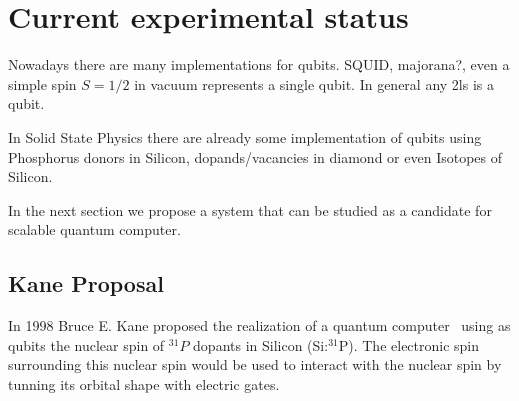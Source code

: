\chapter{Current experimental status}

Nowadays there are many implementations for qubits. SQUID, majorana?, even a simple spin $S=1/2$ in vacuum represents a single qubit. In general any \ac{2ls} is a qubit.

In Solid State Physics there are already some implementation of qubits using Phosphorus donors in Silicon, dopands/vacancies in diamond or even Isotopes of Silicon.

In the next section we propose a system that can be studied as a candidate for scalable quantum computer.

\section{Kane Proposal}
In 1998 Bruce E. Kane proposed the realization of a quantum computer~\cite{Kane1988} using as qubits the nuclear spin of $^{31}P$ dopants in Silicon (Si:$^{31}$P).
The electronic spin surrounding this nuclear spin would be used to interact with the nuclear spin by tunning its orbital shape with electric gates.

